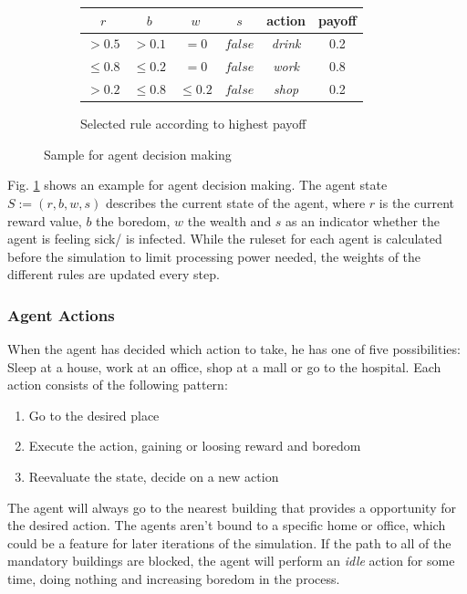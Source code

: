 \documentclass[table]{sig-alternate-05-2015}
\begin{document}
\begin{figure}[h]
\begin{subfigure}{0.5\textwidth}
\begin{center}
\begin{tabular}{c c c c|c c}
$r$ 		& $b$ 		& $w$		& $s$ 		& action & payoff 	\\ \hline 
$>0.5$	& $> 0.1$	& $= 0$	& $false$	& \textit{drink}	&	0.2		\\
$\leq0.8$	& $\leq 0.2$	& $= 0$	& $false$	& \textit{work}	&	0.8		\\
$>0.2$	& $\leq 0.8$	& $\leq 0.2$	& $false$	& \textit{shop}	&	0.2		\\
\end{tabular}
\end{center}
\caption{Selected rule according to highest payoff}
\end{subfigure}
\caption{Sample for agent decision making}
\label{fig:xcs}
\end{figure}

Fig. \ref{fig:xcs} shows an example for agent decision making. The agent state $S :=(r,b,w,s)$ describes the current state of the agent, where $r$ is the current reward value, $b$ the boredom, $w$ the wealth and $s$ as an indicator whether the agent is feeling sick/ is infected. While the ruleset for each agent is calculated before the simulation to limit processing power needed, the weights of the different rules are updated every step.

\subsubsection{Agent Actions}

When the agent has decided which action to take, he has one of five possibilities: Sleep at a house, work at an office,  shop at a mall or go to the hospital. Each action consists of the following pattern:
\begin{enumerate}
\item Go to the desired place
\item Execute the action, gaining or loosing reward and boredom
\item Reevaluate the state, decide on a new action
\end{enumerate}

The agent will always go to the nearest building that provides a opportunity for the desired action. The agents aren't bound to a specific home or office, which could be a feature for later iterations of the simulation. If the path to all of the mandatory buildings are blocked, the agent will perform an \textit{idle} action for some time, doing nothing and increasing boredom in the process.
\end{document}
